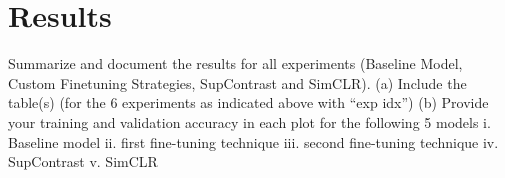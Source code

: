 \section*{Results}

Summarize and document the results for all experiments (Baseline Model, Custom Finetuning Strategies, SupContrast and SimCLR).
(a) Include the table(s) (for the 6 experiments as indicated above with “exp idx”)
(b) Provide your training and validation accuracy in each plot for the following 5 models
i. Baseline model
ii. first fine-tuning technique
iii. second fine-tuning technique iv. SupContrast
v. SimCLR
